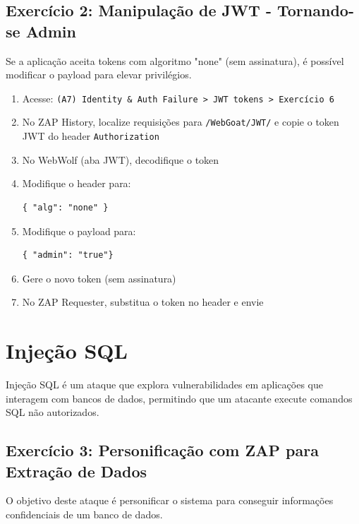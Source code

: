 \documentclass[11pt]{ifscarticle}
\begin{document}
\subsection{Exercício 2: Manipulação de JWT - Tornando-se Admin}

Se a aplicação aceita tokens com algoritmo "none" (sem assinatura), é possível modificar o payload para elevar privilégios.

\begin{enumerate}
    \item Acesse: \texttt{(A7) Identity \& Auth Failure > JWT tokens > Exercício 6}
    \item No ZAP History, localize requisições para \texttt{/WebGoat/JWT/} e copie o token JWT do header \texttt{Authorization}
    \item No WebWolf (aba JWT), decodifique o token
    \item Modifique o header para:
\begin{lstlisting}[style=json]
{ "alg": "none" }
\end{lstlisting}

    \item Modifique o payload para:
\begin{lstlisting}[style=json]
{ "admin": "true"}
\end{lstlisting}
    \item Gere o novo token (sem assinatura)
    \item No ZAP Requester, substitua o token no header e envie
\end{enumerate}



\section{Injeção SQL}
Injeção SQL é um ataque que explora vulnerabilidades em aplicações que interagem com bancos de dados, permitindo que um atacante execute comandos SQL não autorizados.
\subsection{Exercício 3: Personificação com ZAP para Extração de Dados}
O objetivo deste ataque é personificar o sistema para conseguir informações confidenciais de um banco de dados.
\end{document}
